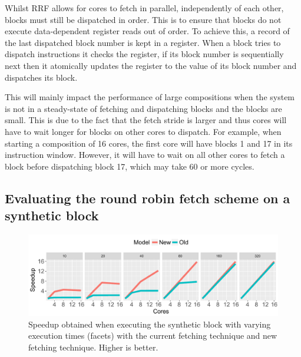 Whilst RRF allows for cores to fetch in parallel, independently of each other, blocks must still be dispatched in order.
This is to ensure that blocks do not execute data-dependent register reads out of order.
To achieve this, a record of the last dispatched block number is kept in a register.
When a block tries to dispatch instructions it checks the register, if its block number is sequentially next then it atomically updates the register to the value of its block number and dispatches its block.

This will mainly impact the performance of large compositions when the system is not in a steady-state of fetching and dispatching blocks and the blocks are small.
This is due to the fact that the fetch stride is larger and thus cores will have to wait longer for blocks on other cores to dispatch.
For example, when starting a composition of 16 cores, the first core will have blocks 1 and 17 in its instruction window.
However, it will have to wait on all other cores to fetch a block before dispatching block 17, which may take 60 or more cycles.

\subsection{Evaluating the round robin fetch scheme on a synthetic block}
\begin{figure}[t]
    \centering
    \includegraphics[width=1\textwidth]{chapter3/graphics/motivation_fetch.pdf}
    \caption{Speedup obtained when executing the synthetic block with varying execution times (facets) with the current fetching technique and new fetching technique. Higher is better.}
    \label{fig:new_fetch_ex}
\vspace{1em}
	\end{figure}

